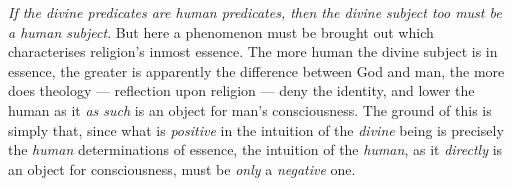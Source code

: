 \documentclass[12pt,a4paper]{book}
\begin{document}
\emph{If the divine predicates are human predicates, then the divine subject
too must be a human subject}. But here a phenomenon must be brought out which
characterises religion's inmost essence. The more human the divine subject is
in essence, the greater is apparently the difference between God and man, the
more does theology --- reflection upon religion --- deny the identity, and
lower the human as it \emph{as such} is an object for man's consciousness. The
ground
of this is simply that, since what is \emph{positive} in the intuition of the
\emph{divine} being is precisely the \emph{human} determinations of essence,
the intuition of the \emph{human}, as it \emph{directly} is an object for
consciousness, must be \emph{only} a \emph{negative} one.
\end{document}
